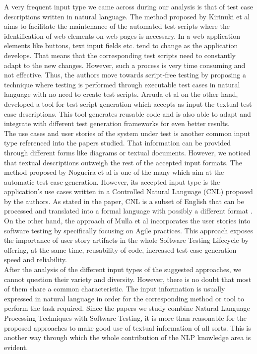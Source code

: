 A very frequent input type we came across during our analysis is that of test case descriptions written in natural language. The method proposed 
by Kirinuki et al \cite{9609160} aims to facilitate the maintenance of the automated test scripts where the identification of web elements on 
web pages is necessary. In a web application elements like buttons, text input fields etc. tend to change as the application develops. That 
means that the corresponding test scripts need to constantly adapt to the new changes. However, such a process is very time consuming and 
not effective. Thus, the authors move towards script-free testing by proposing a technique where testing is performed through executable test 
cases in natural language with no need to create test scripts. Arruda et al \cite{arruda2020automation} on the other hand, developed a tool 
for test script generation which accepts as input the textual test case descriptions. This tool generates reusable code and is also able 
to adapt and integrate with different test generation frameworks for even better results.\\

The use cases and user stories of the system under test is another common input type referenced into the papers studied. That information can be provided through different forms like diagrams or 
textual documents. However, we noticed that textual descriptions outweigh the rest of the accepted input formats. The method proposed by Nogueira et al \cite{nogueira2015automatic} is one of the many which 
aim at the automatic test case generation. However, its accepted input type is the application's use cases written in a Controlled Natural Language (CNL) proposed by the authors. As stated in the paper, CNL 
is a subset of English that can be processed and translated into a formal language with possibly a different format \cite{nogueira2015automatic}. On the other hand, the approach of Mulla et al \cite{mulla2020potent} 
incorporates the user stories into software testing by specifically focusing on Agile practices. This approach exposes the importance of user story artifacts in the whole Software Testing Lifecycle by 
offering, at the same time, reusability of code, increased test case generation speed and reliability.\\

After the analysis of the different input types of the suggested approaches, we cannot question their variety and diversity. However, there is no doubt that most of them share a common characteristic. The input 
information is usually expressed in natural language in order for the corresponding method or tool to perform the task required. Since the papers we study combine Natural Language Processing Techniques with 
Software Testing, it is more than reasonable for the proposed approaches to make good use of textual information of all sorts. This is another way through which the whole contribution of the NLP knowledge area is evident.

